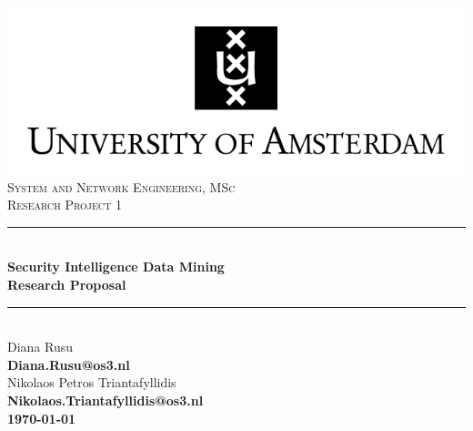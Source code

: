 \documentclass[12pt]{article}
\begin{document}
\begin{titlepage}

\newcommand{\HRule}{\rule{\linewidth}{0.5mm}} 
\center


\includegraphics{images/uva.jpeg}\\[0.5cm]%
 

\textsc{\Large System and Network Engineering, MSc}\\[0.5cm] 
\textsc { \large Research Project 1}\\[0.4cm] %

\HRule \\[0.4cm]
{ \huge \bfseries Security Intelligence Data Mining}\\[0.4cm] %
{ \large \bfseries Research Proposal}\\[0.4cm] %
\HRule \\[0.4cm]






\large Diana Rusu\\
{\bfseries Diana.Rusu@os3.nl}\\[0.5cm]
\large Nikolaos Petros Triantafyllidis\\
\bfseries Nikolaos.Triantafyllidis@os3.nl\\[2cm]

{\large \today} 

\end{titlepage}
\newpage
\end{document}
